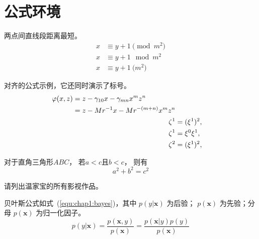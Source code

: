%
%
%
%
%
%
%
%
\chapter{公式环境}

    \begin{axiom}
        \rm 两点间直线段距离最短。  
        \begin{align}
            x&\equiv y+1\pmod{m^2}\\
            x&\equiv y+1\mod{m^2}\\
            x&\equiv y+1\pod{m^2}
        \end{align}
    \end{axiom}

    \begin{remark}
    \rm 对齐的公式示例，它还同时演示了标号。
    \begin{align}
    \begin{split} 
    \varphi(x,z)
    &=z-\gamma_{10}x-\gamma_{mn}x^mz^n\\
    &=z-Mr^{-1}x-Mr^{-(m+n)}x^mz^n
    \end{split} \notag \\
    \noindent\zeta^1&=(\xi^1)^2,\\
    \zeta^1 &=\xi^0\xi^1,\\
    \zeta^2 &=(\xi^1)^2,
    \end{align}
    \end{remark}

    \begin{theorem}
      \rm 对于直角三角形$ABC$， 若$a<c$且$b<c$， 则有
        \begin{equation}
          a^2+b^2=c^2
        \end{equation}
    \end{theorem}


    \begin{exercise}
          \rm 请列出温家宝的所有影视作品。
    \end{exercise}
        
    贝叶斯公式如式~(\ref{equ:chap1:bayes})，其中 $p(y|\mathbf{x})$ 为后验；
    $p(\mathbf{x})$ 为先验；分母 $p(\mathbf{x})$ 为归一化因子。
    \begin{equation}
        \label{equ:chap1:bayes}
        p(y|\mathbf{x}) = \frac{p(\mathbf{x},y)}{p(\mathbf{x})}=
        \frac{p(\mathbf{x}|y)p(y)}{p(\mathbf{x})} 
    \end{equation}
